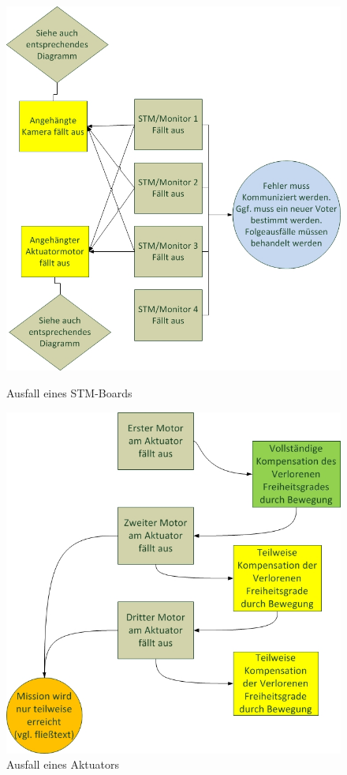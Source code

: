 \begin{figure}[H]
\centering
  \begin{minipage}[b]{0.49\linewidth}
    \includegraphics[width=\linewidth]{Bilder/FaTNet_stmredundanz} 
    \caption{Ausfall eines STM-Boards}
    \label{fig:stmredundanz}
  \end{minipage}
  \begin{minipage}[b]{0.49\linewidth}
    \includegraphics[width=\linewidth]{Bilder/FaTNet_aktuatorredundanz}  
    \caption{Ausfall eines  Aktuators}
    \label{fig:aktuatorredundanz}
  \end{minipage}
\end{figure}



